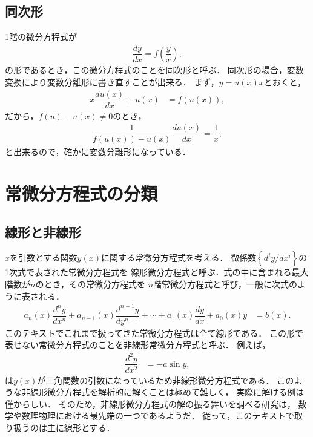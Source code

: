 \subsection{同次形}
%
1階の微分方程式が
\begin{align}
  \dfrac{dy}{dx} = f\left(\dfrac{y}{x}\right),
\end{align}
の形であるとき，この微分方程式のことを同次形と呼ぶ．
同次形の場合，変数変換により変数分離形に書き直すことが出来る．
まず，$y=u\left(x\right)x$とおくと，
\begin{align}
 x\dfrac{du\left(x\right)}{dx}+u\left(x\right) & =f\left(u\left(x\right)\right),
\end{align}
だから，$f\left(u\right) - u\left(x\right) \neq 0$のとき，
\begin{align}
 \dfrac{1}{f\left(u\left(x\right)\right)-u\left(x\right)}\dfrac{du\left(x\right)}{dx}=\dfrac{1}{x},
\end{align}
と出来るので，確かに変数分離形になっている．
\section{常微分方程式の分類}
\subsection{線形と非線形}
$x$を引数とする関数$y\left(x\right)$に関する常微分方程式を考える．
微係数$\left\{d^{i}y/dx^{i}\right\}$の1次式で表された常微分方程式を
線形微分方程式と呼ぶ．式の中に含まれる最大階数が$n$のとき，その常微分方程式を
$n$階常微分方程式と呼び，一般に次式のように表される．
\begin{align}
a_{n}\left(x\right)\dfrac{d^{n}y}{dx^{n}}+a_{n-1}\left(x\right)\dfrac{d^{n-1}y}{dy^{n-1}}+\cdots+a_{1}\left(x\right)\dfrac{dy}{dx}+a_{0}\left(x\right) y & =b\left(x\right).
\end{align}
このテキストでこれまで扱ってきた常微分方程式は全て線形である．
この形で表せない常微分方程式のことを非線形常微分方程式と呼ぶ．
例えば，
\begin{align}
  \dfrac{d^{2}y}{dx^{2}} & =-a\sin y, \label{eq:PDE_general}
\end{align}
は$y\left(x\right)$が三角関数の引数になっているため非線形微分方程式である．
このような非線形微分方程式を解析的に解くことは極めて難しく，
実際に解ける例は僅からしい．
そのため，非線形微分方程式の解の振る舞いを調べる研究は，
数学や数理物理における最先端の一つであるようだ．
従って，このテキストで取り扱うのは主に線形とする．

%
